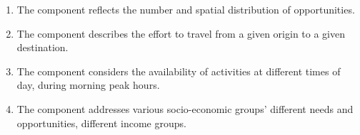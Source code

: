 \begin{enumerate}\styleEnumerate
	\item The  component reflects
	the number and spatial distribution of opportunities.
	
	\item The  component describes the effort
	to travel from a given origin to a given destination.
	
	\item The  component considers the availability of activities at
	different times of day, \eg during morning peak hours.
	
	\item The  component addresses various socio-economic groups' different needs and
	opportunities, \eg different income groups.
\end{enumerate}


